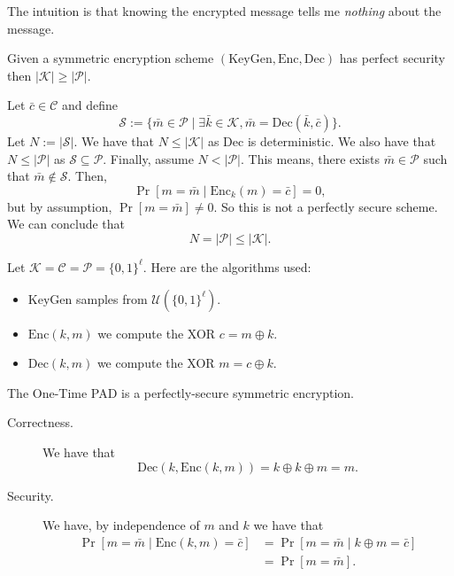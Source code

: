 \documentclass[./main]{subfiles}
\begin{document}
  The intuition is that knowing the encrypted message tells me \textit{nothing} about the message.

  \begin{lem}[Shannon]
    Given a symmetric encryption scheme $(\mathrm{KeyGen}, \mathrm{Enc}, \mathrm{Dec})$ has perfect security then $|\mathcal{K}| \ge |\mathcal{P}|$.
  \end{lem}
  \begin{prv}
    Let $\bar{c} \in \mathcal{C}$ and define \[
    \mathcal{S} := \{\bar{m} \in \mathcal{P}  \mid \exists \bar{k} \in \mathcal{K}, \bar{m} = \mathrm{Dec}(\bar{k}, \bar{c})\}
    .\]
    Let $N := |\mathcal{S}|$.
    We have that $N \le |\mathcal{K}|$ as $\mathrm{Dec}$ is deterministic.
    We also have that $N \le |\mathcal{P}|$ as $\mathcal{S} \subseteq \mathcal{P}$.
    Finally, assume $N < |\mathcal{P}|$.
    This means, there exists $\bar{m} \in \mathcal{P}$ such that $\bar{m} \not\in \mathcal{S}$.
    Then, 
    \[
      \Pr[m = \bar{m}  \mid \mathrm{Enc}_k(m) = \bar{c}] = 0
    ,\] 
    but by assumption, $\Pr[m = \bar{m}] \neq 0$.
    So this is not a perfectly secure scheme.
    We can conclude that \[
    N = |\mathcal{P}| \le |\mathcal{K}|
    .\] 
  \end{prv}

  \begin{exm}
    Let $\mathcal{K} = \mathcal{C} = \mathcal{P} = \{0, 1\}^{\ell}$.
    Here are the algorithms used:
    \begin{itemize}
      \item $\mathrm{KeyGen}$ samples from $\mathcal{U}(\{0,1\}^\ell)$.
      \item $\mathrm{Enc}(k, m)$ we compute the XOR $c = m \oplus k$.
      \item  $\mathrm{Dec}(k,m)$ we compute the XOR $m = c \oplus k$.
    \end{itemize}
  \end{exm}

  \begin{thm}
    The One-Time PAD is a perfectly-secure symmetric encryption.
  \end{thm}
  \begin{prv}
    \begin{description}
      \item[Correctness.]
        We have that
        \[
        \mathrm{Dec}(k, \mathrm{Enc}(k, m)) = k \oplus k \oplus m = m
        .\]
      \item[Security.]
        We have, by independence of $m$ and $k$ we have that
        \begin{align*}
          \Pr[m = \bar{m}  \mid \mathrm{Enc}(k, m) = \bar{c}]
          &= \Pr[m = \bar{m}  \mid k \oplus m = \bar{c} ]\\
          &= \Pr[m = \bar{m}]
        .\end{align*}
    \end{description}
  \end{prv}
\end{document}
